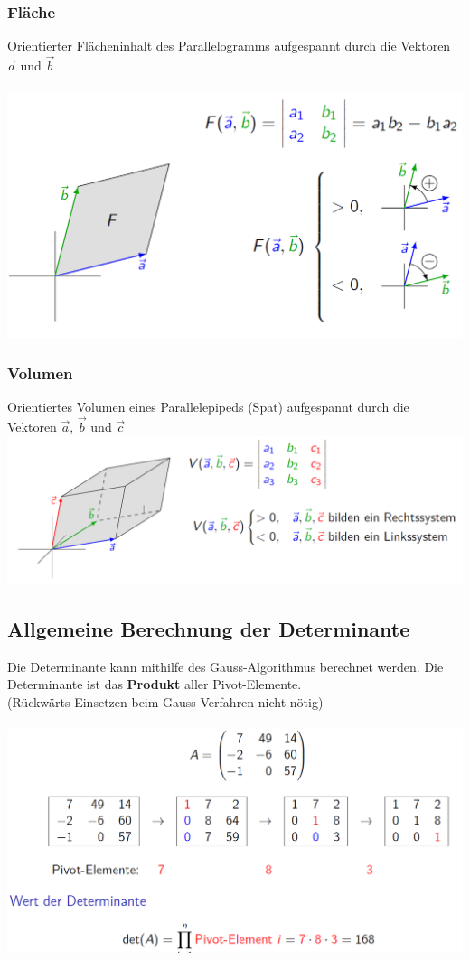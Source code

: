 			\subsubsection{Fläche}
			Orientierter Flächeninhalt des Parallelogramms aufgespannt durch die Vektoren $\vec{a}$ und $\vec{b}$ \\
			\\
 			\includegraphics[width=0.7\linewidth]{Bilder/flaeche-det} \\
			
			
			\subsubsection{Volumen}				    
		    Orientiertes Volumen eines Parallelepipeds (Spat) aufgespannt durch die Vektoren $\vec{a}$, $\vec{b}$ und $\vec{c}$ \\
			\includegraphics[width=0.9\linewidth]{Bilder/volumen-det} \\
				
				
				
			\hfill\null	
			\columnbreak	
			
			
							
								
			\subsection{Allgemeine Berechnung der Determinante}
			Die Determinante kann mithilfe des Gauss-Algorithmus berechnet werden. Die Determinante ist das \textbf{Produkt} aller Pivot-Elemente. \\
			(Rückwärts-Einsetzen beim Gauss-Verfahren nicht nötig) \\
			\\
			 \includegraphics[width=0.8\linewidth]{Bilder/wert-determinante}
			 

